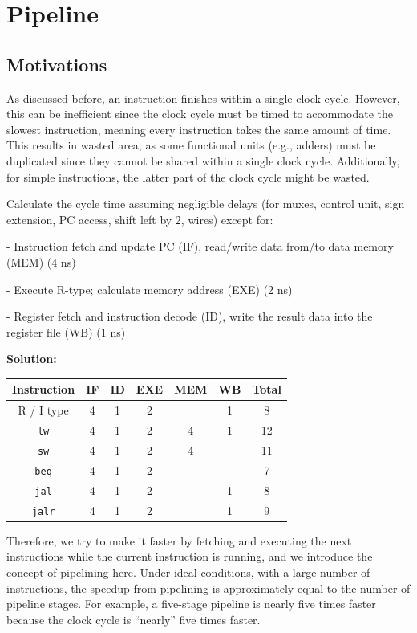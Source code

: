 \chapter{Pipeline}

\section{Motivations}
As discussed before, an instruction finishes within a single clock cycle. However, this can be inefficient since the clock cycle must be timed to accommodate the slowest instruction, meaning every instruction takes the same amount of time. This results in wasted area, as some functional units (e.g., adders) must be duplicated since they cannot be shared within a single clock cycle. Additionally, for simple instructions, the latter part of the clock cycle might be wasted.

\begin{eg}
  Calculate the cycle time assuming negligible delays (for muxes, control unit, sign extension, PC access, shift left by 2, wires) except for:

  - Instruction fetch and update PC (IF), read/write data from/to data memory (MEM) (4 ns)

  - Execute R-type; calculate memory address (EXE) (2 ns)

  - Register fetch and instruction decode (ID), write the result data into the register file (WB) (1 ns)

  \textbf{Solution:} 
  \begin{table}[H]
    \centering
    \begin{tabular}{c|c|c|c|c|c|c}
        \toprule
        Instruction & IF & ID & EXE & MEM & WB &  Total \\
      \midrule
        R / I type & 4 & 1 & 2 &  & 1 & 8  \\
        \verb|lw| & 4 & 1 & 2 & 4 & 1 & 12  \\
        \verb|sw| & 4 & 1 & 2 & 4 &  & 11  \\
        \verb|beq| & 4 & 1 & 2 &  &  & 7  \\
      \midrule
        \verb|jal| & 4 & 1 & 2 &  & 1 & 8  \\
        \verb|jalr| & 4 & 1 & 2 &  & 1 & 9  \\
        \bottomrule
    \end{tabular}
  \end{table}
\end{eg}

Therefore, we try to make it faster by fetching and executing the next instructions while the current instruction is running, and we introduce the concept of pipelining here. Under ideal conditions, with a large number of instructions, the speedup from pipelining is approximately equal to the number of pipeline stages. For example, a five-stage pipeline is nearly five times faster because the clock cycle is ``nearly'' five times faster.

